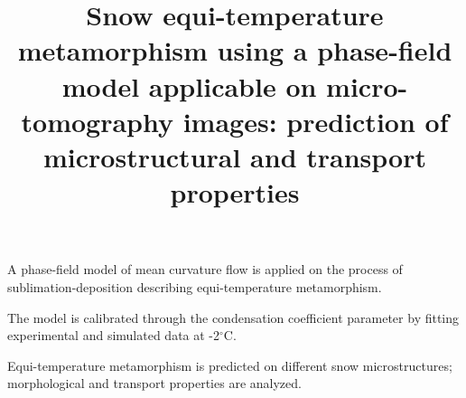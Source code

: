 \documentclass[draft,ms]{agujournal2019}
\begin{document}
\title{Snow equi-temperature metamorphism using a phase-field model applicable on micro-tomography images: prediction of microstructural and transport properties}





\begin{keypoints}
\item A phase-field model of mean curvature flow is applied on the process of sublimation-deposition describing equi-temperature metamorphism.
\item The model is calibrated through the condensation coefficient parameter by fitting experimental and simulated data at -2$^\circ$C.
\item Equi-temperature metamorphism is predicted on different snow microstructures; morphological and transport properties are analyzed.
\end{keypoints}
\end{document}
